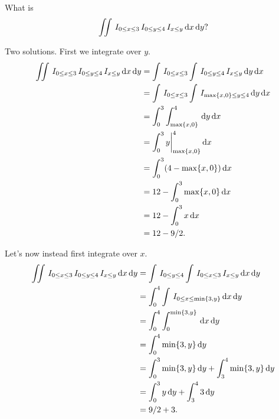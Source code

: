 \begin{exercise}
What is
\begin{align}
\label{eq:5}
\iint \,I_{0\leq x \leq 3} \,I_{0\leq y \leq 4}\,I_{x\leq y}\,\textrm{d}x \,\textrm{d}y?
\end{align}
\begin{solution}
Two solutions. First we integrate over $y$.
\begin{align}
\label{eq:5}
\iint \,I_{0\leq x \leq 3} \,I_{0\leq y \leq 4}\,I_{x\leq y}\,\textrm{d}x \,\textrm{d}y
&=\int \,I_{0\leq x \leq 3} \int \,I_{0\leq y \leq 4}\,I_{x\leq y}\,\textrm{d}y \,\textrm{d}x\\
&=\int \,I_{0\leq x \leq 3} \int \,I_{\max\{x, 0\} \leq y \leq 4}\,\textrm{d}y \,\textrm{d}x\\
&=\int_{0}^{3} \int_{\max\{x, 0\}}^{4}\,\textrm{d}y \,\textrm{d}x\\
&=\int_{0}^{3} y\biggr|_{\max\{x, 0\}}^{4} \,\textrm{d}x\\
&=\int_{0}^{3}  (4-\max\{x, 0\}) \,\textrm{d}x\\
&=12 - \int_{0}^{3} \max\{x, 0\} \,\textrm{d}x\\
&=12 - \int_{0}^{3} x  \,\textrm{d}x\\
&=12 - 9/2.
\end{align}

Let's now instead first integrate over $x$.
\begin{align}
\label{eq:5}
\iint \,I_{0\leq x \leq 3} \,I_{0\leq y \leq 4}\,I_{x\leq y}\,\textrm{d}x \,\textrm{d}y
&= \int \,I_{0\leq y \leq 4} \int \,I_{0\leq x \leq 3} \,I_{x\leq y}\,\textrm{d}x \,\textrm{d}y\\
&= \int_{0}^{4} \int \,I_{0\leq x \leq \min\{3, y\}}\,\textrm{d}x \,\textrm{d}y\\
&= \int_{0}^{4} \int_{0}^{\min\{3, y\}} \,\textrm{d}x \,\textrm{d}y\\
&= \int_{0}^{4} \min\{3, y\}\,\textrm{d}y\\
&= \int_{0}^{3} \min\{3, y\}\,\textrm{d}y + \int_{3}^{4} \min\{3, y\}\,\textrm{d}y\\
&= \int_{0}^{3} y \,\textrm{d}y + \int_{3}^{4}  3\,\textrm{d}y\\
&= 9/2 + 3.
\end{align}
\end{solution}
\end{exercise}



